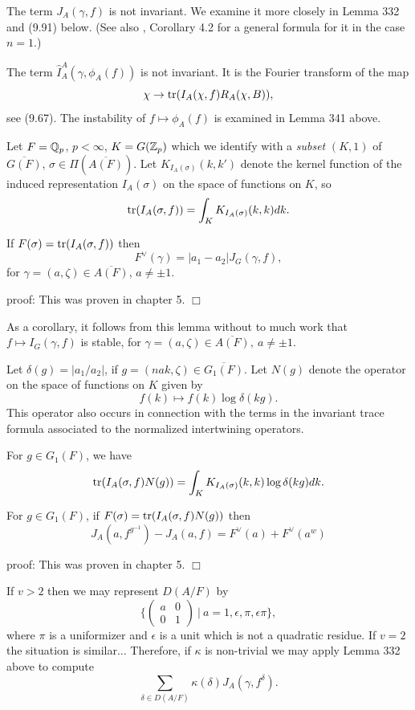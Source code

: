 The term $J_A(\gamma,f)$ is not invariant. We examine it
more closely in Lemma 332 and (9.91) below.
(See also \cite{A16}, Corollary 4.2 for a general formula for it
in the case $n=1$.)

The term $\hat{I}_A^A(\gamma,\phi_A(f))$ is not invariant. It is the
Fourier transform of the map
\[
\chi\rightarrow {\rm tr}(I_A(\chi,f)R_A(\chi,B)),
\]
see (9.67). The instability of $f\longmapsto \phi_A(f)$ is
examined in Lemma 341 above.

Let $F={\Bbb{Q}}_p$, $p<\infty$, $K=G({\Bbb{Z}}_p)$ which we
identify with a {\em subset} $(K,1)$ of $\overline{G(F)}$,
$\sigma\in \Pi(\overline{A(F)})$. Let $K_{I_A(\sigma)}(k,k')$
denote the kernel function of the induced representation
$I_A(\sigma)$ on the space of functions on $K$, so
\begin{equation}
{\rm tr}(I_A(\sigma,f))
=\int_K K_{I_A(\sigma)}(k,k)dk .
\end{equation}

\begin{lemma}
If $F(\sigma)={\rm tr}(I_A(\sigma,f))$ then
\[
F^\vee(\gamma)
=|a_1-a_2|J_G(\gamma,f),
\]
for $\gamma =(a,\zeta)\in \overline{A(F)}$, $a\not= \pm 1$.
\end{lemma}

proof: This was proven in chapter 5. $\Box$

As a corollary, it follows from this lemma without to much work
that $f\longmapsto I_G(\gamma,f)$ is stable, for
$\gamma =(a,\zeta)\in \overline{A(F)},\ a\not= \pm 1$.

Let $\delta(g)=|a_1/a_2|$, if $g=(nak,\zeta)\in \overline{G_1(F)}$. Let
$N(g)$ denote the operator on the space of functions on $K$ given by
\[
f(k)\longmapsto f(k)\log\delta(kg).
\]
This operator also occurs in connection with the terms in the
invariant trace formula associated to the normalized intertwining
operators.

\begin{lemma}
For $g\in G_1(F)$, we have
\[
{\rm tr}(I_A(\sigma,f)N(g))
=\int_K K_{I_A(\sigma)}(k,k)\log\delta(kg)dk.
\]
\end{lemma}

\begin{lemma}
For $g\in G_1(F)$, if
$F(\sigma)={\rm tr}(I_A(\sigma,f)N(g))$ then
\[
J_A(a,f^{g^{-1}})-J_A(a,f)
=F^\vee(a)+F^\vee(a^w)
\]
\end{lemma}
proof: This was proven in chapter 5. $\Box$

If $v>2$ then we may represent $D(A/F)$ by
\[
\{
\left(
\begin{array}{cc}
a&0\\
0&1
\end{array}
\right)\ |\ a=1,\epsilon, \pi, \epsilon\pi \},
\]
where $\pi$ is a uniformizer and $\epsilon$ is a unit
which is not a quadratic residue. If $v=2$ the situation is similar...
Therefore, if $\kappa$ is non-trivial
we may apply Lemma 332 above to compute
\[
\sum_{\delta\in D(A/F)}
\kappa(\delta)J_A(\gamma,f^\delta).
\]

